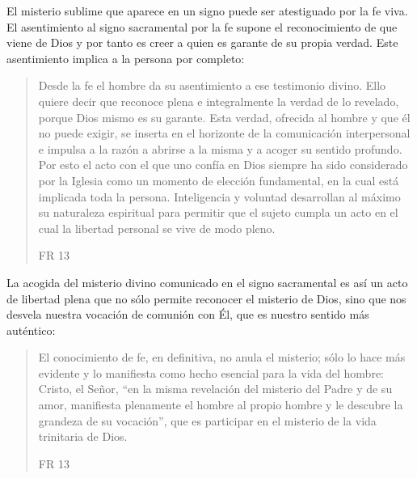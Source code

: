 El misterio sublime que aparece en un signo puede ser atestiguado por la fe
viva. El asentimiento al signo sacramental por la fe supone el reconocimiento de
que viene de Dios y por tanto es creer a quien es garante de su propia verdad.
Este asentimiento implica a la persona por completo:
\blockquote[FR 13]{Desde la fe el hombre da su asentimiento a ese testimonio
  divino. Ello quiere decir que reconoce plena e integralmente la verdad de lo
  revelado, porque Dios mismo es su garante. Esta verdad, ofrecida al hombre y
  que él no puede exigir, se inserta en el horizonte de la comunicación
  interpersonal e impulsa a la razón a abrirse a la misma y a acoger su sentido
  profundo. Por esto el acto con el que uno confía en Dios siempre ha sido
  considerado por la Iglesia como un momento de elección fundamental, en la cual
  está implicada toda la persona. Inteligencia y voluntad desarrollan al máximo
  su naturaleza espiritual para permitir que el sujeto cumpla un acto en el cual
  la libertad personal se vive de modo pleno.}
La acogida del misterio divino comunicado en el signo sacramental es así un acto
de libertad plena que no sólo permite reconocer el misterio de Dios, sino que
nos desvela nuestra vocación de comunión con Él, que es nuestro sentido más
auténtico:
\blockquote[FR 13]{El conocimiento de fe, en definitiva, no anula el misterio;
  sólo lo hace más evidente y lo manifiesta como hecho esencial para la vida del
  hombre: Cristo, el Señor, \enquote{en la misma revelación del misterio del
    Padre y de su amor, manifiesta plenamente el hombre al propio hombre y le
    descubre la grandeza de su vocación}, que es participar en el misterio de la
  vida trinitaria de Dios.}

